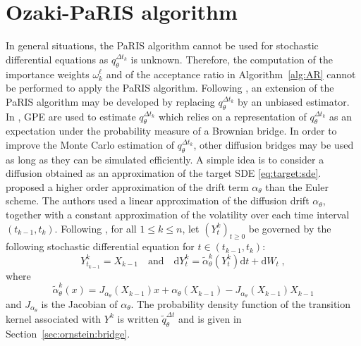 \documentclass[12pt]{article}
\newcommand{\rmd}{\mathrm{d}}
\newcommand{\eqsp}{\;}
\newcommand{\1}{\mathrm{1}}
\begin{document}
\section{Ozaki-PaRIS algorithm}
\label{sec:PaRIS:SDE}
In general situations, the PaRIS algorithm cannot be used for stochastic differential equations as $q^{\Delta t_k}_{\theta}$ is unknown. Therefore, the computation of the importance weights $\omega_{k}^{\ell}$ and of the acceptance ratio in Algorithm~\ref{alg:AR} cannot be performed to apply the PaRIS algorithm. Following \cite{olsson:strojby:2011},
an extension of the PaRIS algorithm may be developed by replacing $q^{\Delta t_k}_{\theta}$  by an unbiased estimator. In \cite{olsson:strojby:2011},  GPE are used to estimate $q^{\Delta t_k}_{\theta}$ which relies on a representation of $q^{\Delta t_k}_{\theta}$ as an expectation under the probability measure of a Brownian bridge. In order to improve the Monte Carlo estimation of $q^{\Delta t_k}_{\theta}$,  other diffusion bridges may be used as long as they can be simulated efficiently. A simple idea is to consider a diffusion obtained as an approximation of the target SDE \eqref{eq:target:sde}. \cite{ozaki:1992,shoji:ozaki:1998} proposed a higher order approximation of the drift term $\alpha_{\theta}$ than the Euler scheme. The authors used a linear approximation of the diffusion drift $\alpha_{\theta}$, together with a constant approximation of the volatility over each time interval $(t_{k-1},t_k)$. Following \cite{ozaki:1992,shoji:ozaki:1998}, for all $1\le k\le n$, let $(Y^{k}_t)_{t\ge 0}$ be governed by the following stochastic differential equation for $t\in(t_{k-1},t_k)$:
\begin{equation}
\label{eq:SDE:Ozaki}
Y^k_{t_{k-1}} = X_{k-1}\quad\mbox{and}\quad\rmd Y^k_t = \widetilde{\alpha}^k_{\theta}(Y^k_t)\rmd t + \rmd W_t\eqsp,
\end{equation}
where
\[
\widetilde{\alpha}^k_{\theta}(x) = J_{\alpha_{\theta}}(X_{k-1})x + \alpha_{\theta}(X_{k-1}) - J_{\alpha_{\theta}}(X_{k-1})X_{k-1}
\]
and $J_{\alpha_{\theta}}$ is the Jacobian of $\alpha_{\theta}$. The probability density function of the transition kernel associated with $Y^k$ is written $\widetilde{q}^{\Delta t}_{\theta}$ and is given in Section~\ref{sec:ornstein:bridge}.
\end{document}
